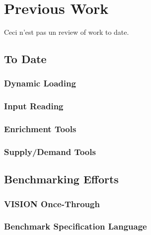 \chapter{Previous Work}\label{ch:prevwork}

Ceci n'est pas un review of work to date. 

\section{\Cyclus To Date}

\subsection{Dynamic Loading}
\subsection{Input Reading}
\subsection{Enrichment Tools}
\subsection{Supply/Demand Tools}
\subsection{\Cyclopts}

\section{Benchmarking Efforts}

\subsection{VISION Once-Through}
\subsection{Benchmark Specification Language}